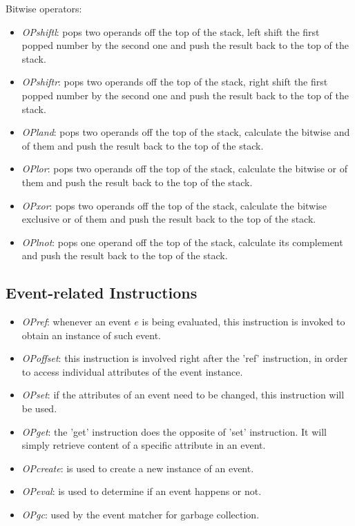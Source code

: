 Bitwise operators:
\begin{itemize}
\item \emph{OPshiftl}: pops two operands off the top of the stack, left shift the first popped number by the second one and push the result back to the top of the stack.
\item \emph{OPshiftr}: pops two operands off the top of the stack, right shift the first popped number by the second one and push the result back to the top of the stack.
\item \emph{OPland}: pops two operands off the top of the stack, calculate the bitwise and of them and push the result back to the top of the stack.
\item \emph{OPlor}: pops two operands off the top of the stack, calculate the bitwise or of them and push the result back to the top of the stack.
\item \emph{OPxor}: pops two operands off the top of the stack, calculate the bitwise exclusive or of them and push the result back to the top of the stack.
\item \emph{OPlnot}: pops one operand off the top of the stack, calculate its complement and push the result back to the top of the stack.
\end{itemize}

\subsection{Event-related Instructions}
\begin{itemize}
\item \emph{OPref}: whenever an event \(e\) is being evaluated, this instruction is invoked to obtain an instance of such event.
\item \emph{OPoffset}: this instruction is involved right after the 'ref' instruction, in order to access individual attributes of the event instance.
\item \emph{OPset}: if the attributes of an event need to be changed, this instruction will be used.
\item \emph{OPget}: the 'get' instruction does the opposite of 'set' instruction. It will simply retrieve content of a specific attribute in an event.
\item \emph{OPcreate}: is used to create a new instance of an event.
\item \emph{OPeval}: is used to determine if an event happens or not.
\item \emph{OPgc}: used by the event matcher for garbage collection.
\end{itemize}